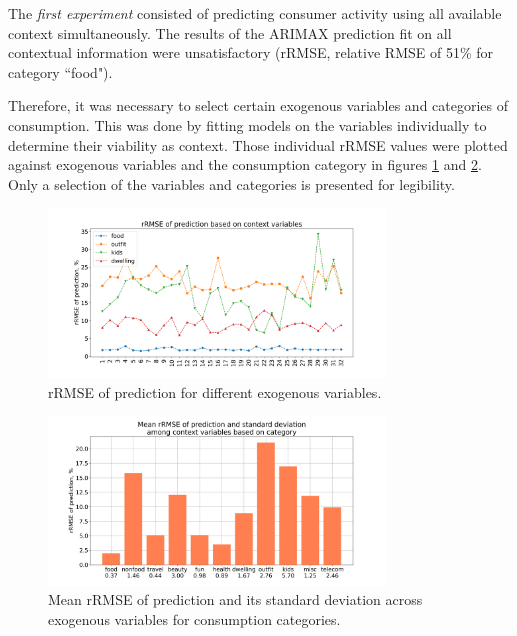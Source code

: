 \documentclass[13pt, a4paper]{article}
\begin{document}
The \textit{first experiment} consisted of predicting consumer activity using all available context simultaneously. The results of the ARIMAX prediction fit on all contextual information were unsatisfactory (rRMSE, relative RMSE of 51\% for category ``food"). 

Therefore, it was necessary to select certain exogenous variables and categories of consumption. This was done by fitting models on the variables individually to determine their viability as context. Those individual rRMSE values were plotted against exogenous variables and the consumption category in figures \ref{fig:gr10} and \ref{fig:gr11}. Only a selection of the variables and categories is presented for legibility.

\begin{figure}[h!]\vspace*{4pt}
\centerline{\includegraphics[width=0.8\textwidth]{./visuals/gr10.png}}
\caption{rRMSE of prediction for different exogenous variables.}
\label{fig:gr10}
\end{figure}

\begin{figure}[h!]\vspace*{4pt}
\centerline{\includegraphics[width=0.8\textwidth]{./visuals/gr11.png}}
\caption{Mean rRMSE of prediction and its standard deviation across exogenous variables for consumption categories.}
\label{fig:gr11}
\end{figure}
\end{document}
